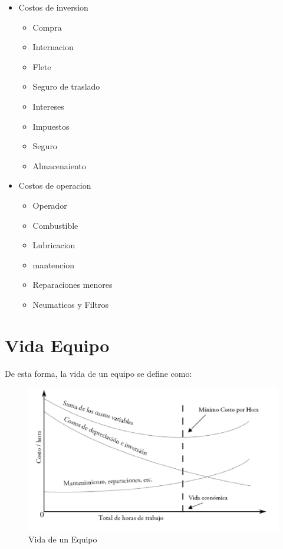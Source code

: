 \begin{itemize}
    \item Costos de inversion
    \begin{itemize}
        \item Compra 
        \item Internacion
        \item Flete
        \item Seguro de traslado
        \item Intereses
        \item Impuestos
        \item Seguro
        \item Almacenaiento
    \end{itemize}
    \item Costos de operacion
    \begin{itemize}
        \item Operador
        \item Combustible
        \item Lubricacion
        \item mantencion
        \item Reparaciones menores
        \item Neumaticos y Filtros
    \end{itemize}
\end{itemize}

\newpage
\section{Vida Equipo}

De esta forma, la vida de un equipo se define como:

\begin{figure}[H]
    \centering
    \includegraphics[width=0.8\linewidth]{FOTOS/vida_equipo.png}
    \caption{Vida de un Equipo}
    \label{fig:vida}
\end{figure}